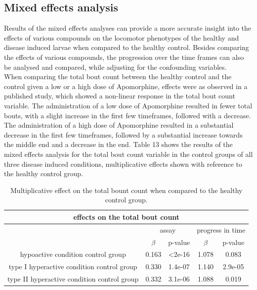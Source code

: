 \documentclass[a4paper,12pt]{article}
\begin{document}
\subsection{Mixed effects analysis}
Results of the mixed effects analyses can provide a more accurate insight into the effects of various compounds on the locomotor phenotypes of the healthy and disease induced larvae when compared to the healthy control. Besides comparing the effects of various compounds, the progression over the time frames can also be analysed and compared, while adjusting for the confounding variables.\\
When comparing the total bout count between the healthy control and the control given a low or a high dose of Apomorphine, effects were as observed in a published study\cite{ref18}, which showed a non-linear response in the total bout count variable. The administration of a low dose of Apomorphine resulted in fewer total bouts, with a slight increase in the first few timeframes, followed with a decrease. The administration of a high dose of Apomorphine resulted in a substantial decrease in the first few timeframes, followed by a substantial increase towards the middle end and a decrease in the end. Table 13 shows the results of the mixed effects analysis for the total bout count variable in the control groups of all three disease induced conditions, multiplicative effects shown with reference to the healthy control group.
\begin{table}[h!]\tiny
\centering
\begin{tabular}{|c|c|c|c|c|}
\hline
\multicolumn{5}{|c|}{effects on the total bout count}                              \\ \hline
                                   & \multicolumn{2}{c|}{assay} & \multicolumn{2}{c|}{progress in time} \\ \cline{2-5}
                                   &  $\beta$            & p-value      &      $\beta$              & p-value           \\ \hline
hypoactive condition control group             & 0.163      & \textless2e-16        & 1.078             & 0.083             \\ \hline
type I hyperactive condition control group      & 0.330      & 1.4e-07        & 1.140             & 2.9e-05            \\ \hline
type II hyperactive condition control group    & 0.332     & 3.1e-06        & 1.088             & 0.019             \\ \hline
\end{tabular}
\caption{Multiplicative effect on the total bount count when compared to the healthy control group.}
\end{table}
\end{document}
